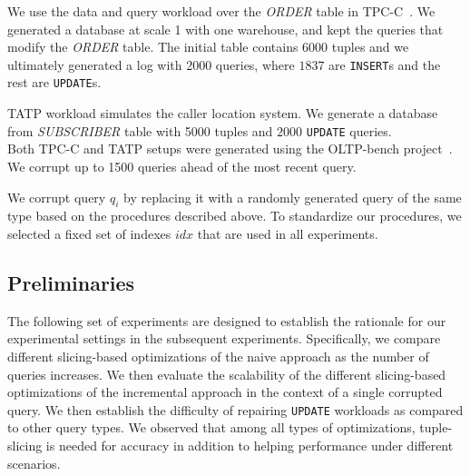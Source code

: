  We use the data and query workload over the {\it ORDER} table in TPC-C~\cite{tpcc}.  
We generated a database at scale 1 with one warehouse, and kept the queries that modify the
{\it ORDER} table. The initial table contains 6000 tuples and we ultimately generated a log with
2000 queries, where $1837$ are \texttt{INSERT}s and the rest are \texttt{UPDATE}s. 

 TATP workload simulates the 
caller location system. We generate a database from {\it SUBSCRIBER} table
with 5000 tuples and $2000$ \texttt{UPDATE} queries.\\
Both TPC-C and TATP setups were generated using the OLTP-bench project~\cite{difallah2013oltp}. 
We corrupt up to 1500 queries ahead of the most recent query.  



 We corrupt query $q_i$ by replacing it with a randomly
generated query of the same type based on the procedures described above.
To standardize our procedures, we selected a fixed set of indexes $idx$
that are used in all experiments.  










\subsection{Preliminaries}
The following set of experiments are designed to establish the rationale for 
our experimental settings in the subsequent experiments.  
Specifically, we compare different slicing-based optimizations of the naive approach
as the number of queries increases.  
We then evaluate the scalability of the different slicing-based optimizations of the 
incremental approach in the context of a single
corrupted query. We then establish the difficulty of repairing \texttt{UPDATE} 
workloads as compared to other query types. We observed that among all types of 
optimizations, tuple-slicing is needed for accuracy in addition to helping performance
under different scenarios.


